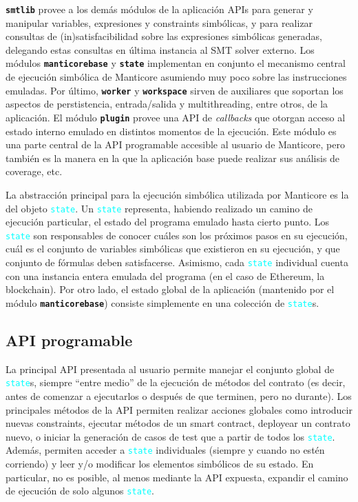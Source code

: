 \texttt{\textbf{smtlib}} provee a los demás módulos de la aplicación APIs para generar y manipular variables, expresiones y constraints simbólicas, y para realizar consultas de (in)satisfacibilidad sobre las expresiones simbólicas generadas, delegando estas consultas en última instancia al SMT solver externo.
Los módulos \texttt{\textbf{manticorebase}} y \texttt{\textbf{state}} implementan en conjunto el mecanismo central de ejecución simbólica de Manticore asumiendo muy poco sobre las instrucciones emuladas.
Por último, \texttt{\textbf{worker}} y \texttt{\textbf{workspace}} sirven de auxiliares que soportan los aspectos de perstistencia, entrada/salida y multithreading, entre otros, de la aplicación.
El módulo \texttt{\textbf{plugin}} provee una API de \textit{callbacks} que otorgan acceso al estado interno emulado en distintos momentos de la ejecución.
Este módulo es una parte central de la API programable accesible al usuario de Manticore, pero también es la manera en la que la aplicación base puede realizar sus análisis de coverage, etc.

La abstracción principal para la ejecución simbólica utilizada por Manticore es la del objeto \textcolor{cyan}{\texttt{state}}.
Un \textcolor{cyan}{\texttt{state}} representa, habiendo realizado un camino de ejecución particular, el estado del programa emulado hasta cierto punto.
Los \textcolor{cyan}{\texttt{state}} son responsables de conocer cuáles son los próximos pasos en su ejecución, cuál es el conjunto de variables simbólicas que existieron en su ejecución, y que conjunto de fórmulas deben satisfacerse.
Asimismo, cada \textcolor{cyan}{\texttt{state}} individual cuenta con una instancia entera emulada del programa (en el caso de Ethereum, la blockchain).
Por otro lado, el estado global de la aplicación (mantenido por el módulo \texttt{\textbf{manticorebase}}) consiste simplemente en una colección de \textcolor{cyan}{\texttt{state}}s.

\subsection{API programable}
La principal API presentada al usuario permite manejar el conjunto global de \textcolor{cyan}{\texttt{state}}s, siempre ``entre medio'' de la ejecución de métodos del contrato (es decir, antes de comenzar a ejecutarlos o después de que terminen, pero no durante).
Los principales métodos de la API permiten realizar acciones globales como introducir nuevas constraints, ejecutar métodos de un smart contract, deployear un contrato nuevo, o iniciar la generación de casos de test que a partir de todos los \textcolor{cyan}{\texttt{state}}.
Además, permiten acceder a \textcolor{cyan}{\texttt{state}} individuales (siempre y cuando no estén corriendo) y leer y/o modificar los elementos simbólicos de su estado.
En particular, no es posible, al menos mediante la API expuesta, expandir el camino de ejecución de solo algunos \textcolor{cyan}{\texttt{state}}.

